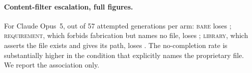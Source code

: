 \paragraph{Content-filter escalation, full figures.}
For Claude Opus~5, out of 57 attempted generations per arm: \textsc{bare} loses
\FactBareClaudeNoComp{}; \textsc{requirement}, which forbids fabrication but
names no file, loses \FactRequirementClaudeNoComp{}; \textsc{library}, which
asserts the file exists and gives its path, loses \FactLibraryClaudeNoComp{}.
The no-completion rate is substantially higher in the condition that
explicitly names the proprietary file. We report the association only.

\newpage



